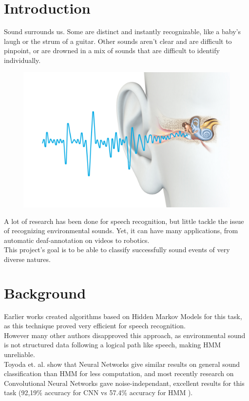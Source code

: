 \documentclass[final]{beamer}
\title
[Final Presentation for ML Course, June 13th 2017, Beijing]
{ %
Freesound General-Purpose Audio Tagging Challenge
}
\author{ %
Usama Zafar, Sarah Gross
}
\institute
{
	Tsinghua University, China
}
\date{\today}
\begin{document}
\begin{frame}[t]
\begin{multicols}{3}

\section{Introduction}

	Sound surrounds us. Some are distinct and instantly recognizable, like a baby's laugh or the strum of a guitar. Other sounds aren't clear and are difficult to pinpoint, or are drowned in a mix of sounds that are difficult to identify individually.\\

	\begin{figure}
	\centering
	\includegraphics[width=0.4\columnwidth]{ear_sound.jpg}
	\end{figure}

	A lot of research has been done for speech recognition, but little tackle the issue of recognizing environmental sounds. Yet, it can have many applications, from automatic deaf-annotation on videos to robotics.\\
	This project's goal is to be able to classify successfully sound events of very diverse natures.

\section{Background}

	Earlier works \cite{ref1} \cite{ref2} created algorithms based on Hidden Markov Models for this task, as this technique proved very efficient for speech recognition.\\
	However many other authors \cite{ref3} \cite{ref4} disapproved this approach, as environmental sound is not structured data following a logical path like speech, making HMM unreliable.\\
	Toyoda et. al. \cite{ref5} show that Neural Networks give similar results on general sound classification than HMM for less computation, and most recently research on Convolutional Neural Networks \cite{ref4} \cite{ref6} gave noise-independant, excellent results for this task (92,19\% accuracy for CNN vs 57.4\% accuracy for HMM \cite{ref4}).


\end{multicols}
\end{frame}
\end{document}
